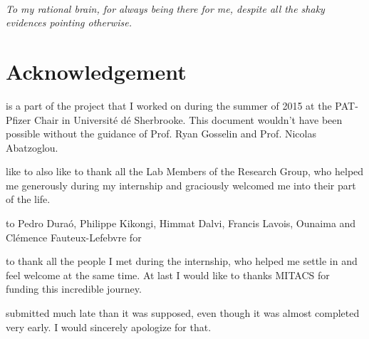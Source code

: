 \documentclass{tufte-book} %
\begin{document}
~\vfill
\begin{doublespace}
\noindent\fontsize{18}{22}\selectfont\itshape
\nohyphenation
To my rational brain, for always being there for me, despite all the shaky evidences pointing otherwise. 
\end{doublespace}
\vfill
\vfill



\chapter{Acknowledgement} %
\label{ch:0}

     is a part of the project that I
    worked on during the summer of 2015 at the PAT-Pfizer Chair in
    Universit\'e  d\'e  Sherbrooke. This document wouldn't have been
    possible without the guidance of Prof. Ryan Gosselin and
    Prof. Nicolas Abatzoglou. 

     like to also like to thank all the Lab Members of the Research Group, who helped me generously during my internship and graciously welcomed me into their part of the life.

    to Pedro Dura\'o, Philippe Kikongi, Himmat Dalvi, Francis Lavois, Ounaima  and Cl\'emence Fauteux-Lefebvre for  

    to thank all the people I met during the internship, who helped me settle in and feel welcome at the same time. At last I would like to thanks MITACS for funding this incredible journey.
    
     submitted much late than it was supposed, even though it was almost completed very early. I would sincerely apologize for that. 

   

    
    
 



\mainmatter
\end{document}
